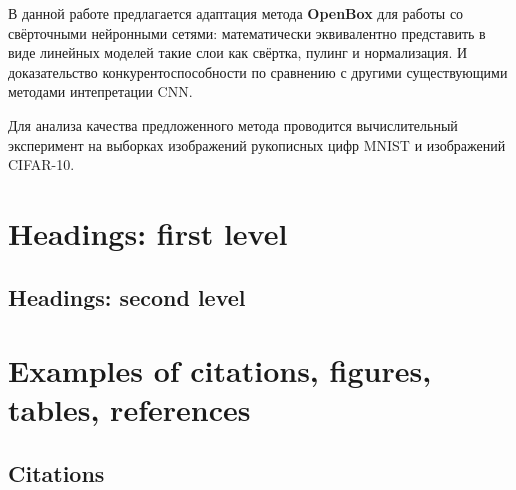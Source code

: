 \documentclass[12pt]{article}
\begin{document}
В данной работе предлагается адаптация метода \textbf{OpenBox} для работы со свёрточными нейронными сетями: математически эквивалентно представить в виде линейных моделей такие слои как свёртка, пулинг и нормализация. И доказательство конкурентоспособности по сравнению с другими существующими методами интепретации CNN.

Для анализа качества предложенного метода проводится вычислительный эксперимент на выборках изображений рукописных цифр MNIST и изображений CIFAR-10.




\section{Headings: first level}
\label{sec:headings}


\subsection{Headings: second level}





\section{Examples of citations, figures, tables, references}

\subsection{Citations}
\end{document}
